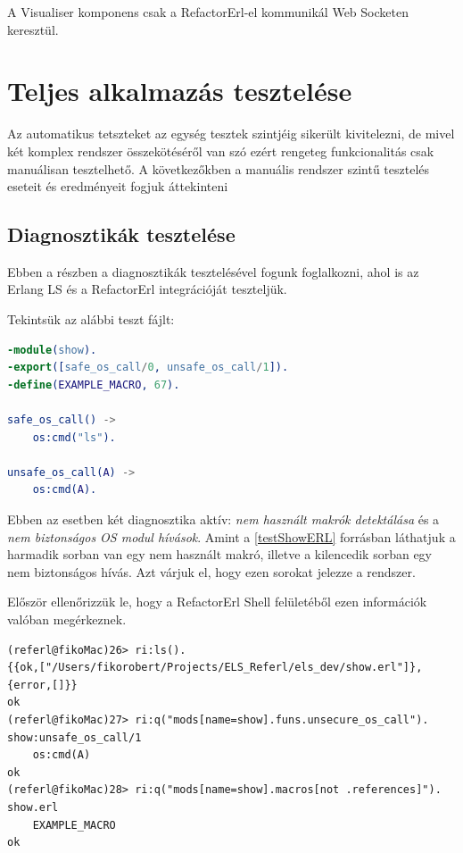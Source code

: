 A Visualiser komponens csak a RefactorErl-el kommunikál Web Socketen keresztül.



\section{Teljes alkalmazás tesztelése}

Az automatikus tetszteket az egység tesztek szintjéig sikerült kivitelezni, de mivel két komplex rendszer összekötéséről van szó ezért rengeteg funkcionalitás csak manuálisan tesztelhető. A következőkben a manuális rendszer szintű tesztelés eseteit és eredményeit fogjuk áttekinteni

\subsection{Diagnosztikák tesztelése}

Ebben a részben a diagnosztikák tesztelésével fogunk foglalkozni, ahol is az Erlang LS és a RefactorErl integrációját teszteljük.

\noindent Tekintsük az alábbi teszt fájlt:

 \label{testShowERL}
\begin{lstlisting}[language={erlang}]  
-module(show).
-export([safe_os_call/0, unsafe_os_call/1]).
-define(EXAMPLE_MACRO, 67).

safe_os_call() ->
    os:cmd("ls").

unsafe_os_call(A) ->
    os:cmd(A).
\end{lstlisting}

Ebben az esetben két diagnosztika aktív: \textit{nem használt makrók detektálása} és a \textit{nem biztonságos OS modul hívások}. Amint a \ref{testShowERL} forrásban láthatjuk a harmadik sorban van egy nem használt makró, illetve a kilencedik sorban egy nem biztonságos hívás. Azt várjuk el, hogy ezen sorokat jelezze a rendszer.

\noindent Először ellenőrizzük le, hogy a RefactorErl Shell felületéből ezen információk valóban megérkeznek.

 \label{testShowSHELL}
\begin{lstlisting}[language={shell}]  
(referl@fikoMac)26> ri:ls().                                        
{{ok,["/Users/fikorobert/Projects/ELS_Referl/els_dev/show.erl"]},{error,[]}}
ok
(referl@fikoMac)27> ri:q("mods[name=show].funs.unsecure_os_call").  
show:unsafe_os_call/1
    os:cmd(A)
ok
(referl@fikoMac)28> ri:q("mods[name=show].macros[not .references]").
show.erl
    EXAMPLE_MACRO
ok
\end{lstlisting}

